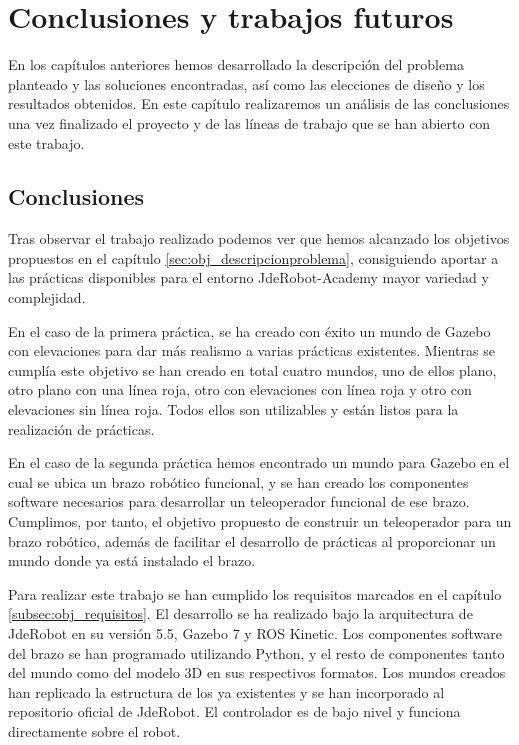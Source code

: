 \chapter{Conclusiones y trabajos futuros}
\label{ch:Conclusiones}

En los capítulos anteriores hemos desarrollado la descripción del problema planteado y las soluciones encontradas, así como las elecciones de diseño y los resultados obtenidos. En este capítulo realizaremos un análisis de las conclusiones una vez finalizado el proyecto y de las líneas de trabajo que se han abierto con este trabajo.

\section{Conclusiones}
\label{sec:cn_conclusiones}

Tras observar el trabajo realizado podemos ver que hemos alcanzado los objetivos propuestos en el capítulo \ref{sec:obj_descripcionproblema}, consiguiendo aportar a las prácticas disponibles para el entorno JdeRobot-Academy mayor variedad y complejidad.

En el caso de la primera práctica, se ha creado con éxito un mundo de Gazebo con elevaciones para dar más realismo a varias prácticas existentes. Mientras se cumplía este objetivo se han creado en total cuatro mundos, uno de ellos plano, otro plano con una línea roja, otro con elevaciones con línea roja y otro con elevaciones sin línea roja. Todos ellos son utilizables y están listos para la realización de prácticas.

En el caso de la segunda práctica hemos encontrado un mundo para Gazebo en el cual se ubica un brazo robótico funcional, y se han creado los componentes software necesarios para desarrollar un teleoperador funcional de ese brazo. Cumplimos, por tanto, el objetivo propuesto de construir un teleoperador para un brazo robótico, además de facilitar el desarrollo de prácticas al proporcionar un mundo donde ya está instalado el brazo.

Para realizar este trabajo se han cumplido los requisitos marcados en el capítulo \ref{subsec:obj_requisitos}. El desarrollo se ha realizado bajo la arquitectura de JdeRobot en su versión 5.5, Gazebo 7 y ROS Kinetic. Los componentes software del brazo se han programado utilizando Python, y el resto de componentes tanto del mundo como del modelo 3D en sus respectivos formatos. Los mundos creados han replicado la estructura de los ya existentes y se han incorporado al repositorio oficial de JdeRobot. El controlador es de bajo nivel y funciona directamente sobre el robot.

